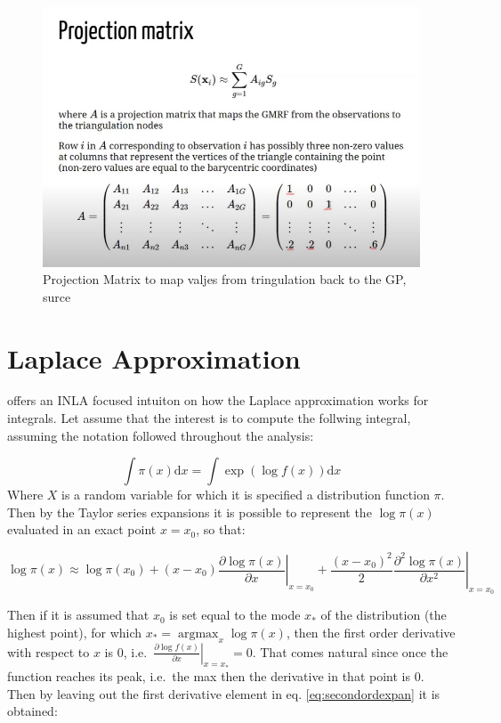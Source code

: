 \documentclass[
  12pt,
  a4paper,
  oneside]{book}
\theoremstyle{definition}
\theoremstyle{definition}
\theoremstyle{definition}
\theoremstyle{remark}
\begin{document}
\begin{figure}
\centering
\includegraphics{appendix_images/appendix_proj.jpg}
\caption{\label{fig:projmat}Projection Matrix to map valjes from tringulation back to the GP, \citet{YT:paumoraga} surce}
\end{figure}

\hypertarget{laplaceapprox}{%
\section{Laplace Approximation}\label{laplaceapprox}}

\citet{Blangiardo-Cameletti} offers an INLA focused intuiton on how the Laplace approximation works for integrals. Let assume that the interest is to compute the follwing integral, assuming the notation followed throughout the analysis:

\[
\int \pi(x) \mathrm{d} x=\int \exp (\log f(x)) \mathrm{d} x
\]
Where \(X\) is a random variable for which it is specified a distribution function \(\pi\). Then by the Taylor series expansions \citep{taylorseries} it is possible to represent the \(\log \pi(x)\) evaluated in an exact point \(x = x_0\), so that:

\begin{equation}
\log \pi(x) \approx \log \pi\left(x_{0}\right)+\left.\left(x-x_{0}\right) \frac{\partial \log \pi(x)}{\partial x}\right|_{x=x_{0}}+\left.\frac{\left(x-x_{0}\right)^{2}}{2} \frac{\partial^{2} \log \pi(x)}{\partial x^{2}}\right|_{x=x_{0}}
\label{eq:secondordexpan}
\end{equation}

Then if it is assumed that \(x_0\) is set equal to the mode \(x_*\) of the distribution (the highest point), for which \(x_{*}=\operatorname{argmax}_{x} \log \pi(x)\), then the first order derivative with respect to \(x\) is 0, i.e.~\(\left.\frac{\partial \log f(x)}{\partial x}\right|_{x=x_{*}}=0\). That comes natural since once the function reaches its peak, i.e.~the max then the derivative in that point is 0. Then by leaving out the first derivative element in eq. \eqref{eq:secondordexpan} it is obtained:
\end{document}
